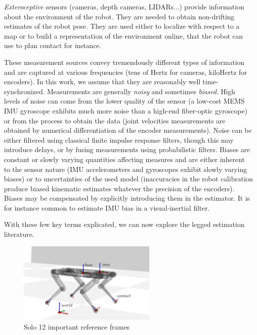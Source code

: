 \textit{Exteroceptive} sensors (cameras, depth cameras, LIDARs...) provide information about the environment of the robot.  
They are needed to obtain non-drifting estimates of the robot pose. 
They are used either to localize with respect to a map or to build a representation of the environment online, that the robot can use to plan contact for instance. 

These measurement sources convey tremendously different types of information and are captured at various frequencies (\eg tens of Hertz for cameras, kiloHertz for encoders). 
In this work, we assume that they are reasonably well time-synchronized. Measurements are generally \textit{noisy} and sometimes \textit{biased}. High levels of noise can 
come from the lower quality of the sensor (a low-cost MEMS IMU gyroscope exhibits much more noise than a high-end fiber-optic gyroscope) or from the process to obtain the
data (joint velocities measurements are obtained by numerical differentiation of the encoder measurements). Noise can be either filtered using classical finite impulse 
response filters, though this may introduce delays, or by fusing measurements using probabilistic filters. Biases are constant or slowly varying quantities affecting measures 
and are either inherent to the sensor nature (IMU accelerometers and gyroscopes exhibit slowly varying biases) or to uncertainties of the used model (inaccuracies
in the robot calibration produce biased kinematic estimates whatever the precision of the encoders). Biases may be compensated by explicitly introducing them in 
the estimator. It is for instance common to estimate IMU bias in a visual-inertial filter. 

With these few key terms explicated, we can now explore the legged estimation literature.


\begin{figure}
    \centering
    \includegraphics[width=0.6\textwidth]{figures/solo_frames.pdf}
    \caption{Solo 12 \cite{grimminger2020open} important reference frames}
    \label{fig:solo_frames}
\end{figure}
    

